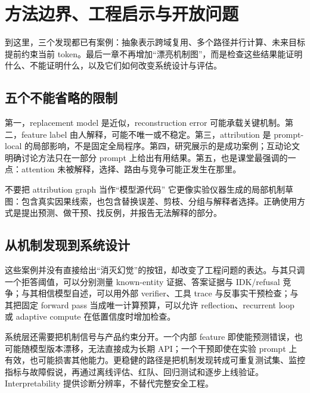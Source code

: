 \section{方法边界、工程启示与开放问题}

到这里，三个发现都已有案例：抽象表示跨域复用、多个路径并行计算、未来目标提前约束当前 token。最后一章不再增加“漂亮机制图”，而是检查这些结果能证明什么、不能证明什么，以及它们如何改变系统设计与评估。


\subsection{五个不能省略的限制}

第一，replacement model 是近似，reconstruction error 可能承载关键机制。第二，feature label 由人解释，可能不唯一或不稳定。第三，attribution 是 prompt-local 的局部影响，不是固定全局程序。第四，研究展示的是成功案例；互动论文明确讨论方法只在一部分 prompt 上给出有用结果。第五，也是课堂最强调的一点：attention 未被解释，选择、路由与竞争可能正发生在那里。

\begin{warningbox}{不要把 attribution graph 当作“模型源代码”}
它更像实验仪器生成的局部机制草图：包含真实因果线索，也包含替换误差、剪枝、分组与解释者选择。正确使用方式是提出预测、做干预、找反例，并报告无法解释的部分。
\end{warningbox}

\subsection{从机制发现到系统设计}

这些案例并没有直接给出“消灭幻觉”的按钮，却改变了工程问题的表达。与其只调一个拒答阈值，可以分别测量 known-entity 证据、答案证据与 IDK/refusal 竞争；与其相信模型自述，可以用外部 verifier、工具 trace 与反事实干预检查；与其把固定 forward pass 当成唯一计算预算，可以允许 reflection、recurrent loop 或 adaptive compute 在低置信度时增加检查。

系统层还需要把机制信号与产品约束分开。一个内部 feature 即使能预测错误，也可能随模型版本漂移，无法直接成为长期 API；一个干预即使在实验 prompt 上有效，也可能损害其他能力。更稳健的路径是把机制发现转成可重复测试集、监控指标与故障假说，再通过离线评估、红队、回归测试和逐步上线验证。Interpretability 提供诊断分辨率，不替代完整安全工程。


